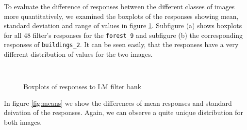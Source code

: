 To evaluate the difference of responses between the different classes of images more quantitatively, we examined the boxplots of the responses showing mean, standard deviation and range of values in figure \ref{fig:boxplots}. Subfigure (a) shows boxplots for all 48 filter's responses for the \texttt{forest\_9} and subfigure (b) the corresponding responses of \texttt{buildings\_2}. It can be seen easily, that the responses have a very different distribution of values for the two images.

\begin{figure}[!hbt]
\centering
{} \\
\caption{Boxplots of responses to LM filter bank}
\label{fig:boxplots}
\end{figure}

In figure \ref{fig:means} we show the differences of mean responses and standard deivation of the responses. Again, we can observe a quite unique distribution for both images.

